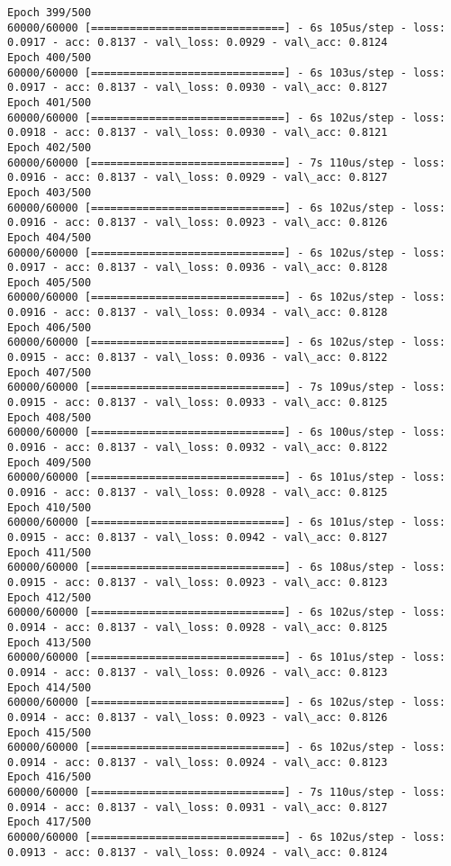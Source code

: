 \documentclass[11pt]{article}
\begin{document}
\begin{Verbatim}[commandchars=\\\{\}]
Epoch 399/500
60000/60000 [==============================] - 6s 105us/step - loss: 0.0917 - acc: 0.8137 - val\_loss: 0.0929 - val\_acc: 0.8124
Epoch 400/500
60000/60000 [==============================] - 6s 103us/step - loss: 0.0917 - acc: 0.8137 - val\_loss: 0.0930 - val\_acc: 0.8127
Epoch 401/500
60000/60000 [==============================] - 6s 102us/step - loss: 0.0918 - acc: 0.8137 - val\_loss: 0.0930 - val\_acc: 0.8121
Epoch 402/500
60000/60000 [==============================] - 7s 110us/step - loss: 0.0916 - acc: 0.8137 - val\_loss: 0.0929 - val\_acc: 0.8127
Epoch 403/500
60000/60000 [==============================] - 6s 102us/step - loss: 0.0916 - acc: 0.8137 - val\_loss: 0.0923 - val\_acc: 0.8126
Epoch 404/500
60000/60000 [==============================] - 6s 102us/step - loss: 0.0917 - acc: 0.8137 - val\_loss: 0.0936 - val\_acc: 0.8128
Epoch 405/500
60000/60000 [==============================] - 6s 102us/step - loss: 0.0916 - acc: 0.8137 - val\_loss: 0.0934 - val\_acc: 0.8128
Epoch 406/500
60000/60000 [==============================] - 6s 102us/step - loss: 0.0915 - acc: 0.8137 - val\_loss: 0.0936 - val\_acc: 0.8122
Epoch 407/500
60000/60000 [==============================] - 7s 109us/step - loss: 0.0915 - acc: 0.8137 - val\_loss: 0.0933 - val\_acc: 0.8125
Epoch 408/500
60000/60000 [==============================] - 6s 100us/step - loss: 0.0916 - acc: 0.8137 - val\_loss: 0.0932 - val\_acc: 0.8122
Epoch 409/500
60000/60000 [==============================] - 6s 101us/step - loss: 0.0916 - acc: 0.8137 - val\_loss: 0.0928 - val\_acc: 0.8125
Epoch 410/500
60000/60000 [==============================] - 6s 101us/step - loss: 0.0915 - acc: 0.8137 - val\_loss: 0.0942 - val\_acc: 0.8127
Epoch 411/500
60000/60000 [==============================] - 6s 108us/step - loss: 0.0915 - acc: 0.8137 - val\_loss: 0.0923 - val\_acc: 0.8123
Epoch 412/500
60000/60000 [==============================] - 6s 102us/step - loss: 0.0914 - acc: 0.8137 - val\_loss: 0.0928 - val\_acc: 0.8125
Epoch 413/500
60000/60000 [==============================] - 6s 101us/step - loss: 0.0914 - acc: 0.8137 - val\_loss: 0.0926 - val\_acc: 0.8123
Epoch 414/500
60000/60000 [==============================] - 6s 102us/step - loss: 0.0914 - acc: 0.8137 - val\_loss: 0.0923 - val\_acc: 0.8126
Epoch 415/500
60000/60000 [==============================] - 6s 102us/step - loss: 0.0914 - acc: 0.8137 - val\_loss: 0.0924 - val\_acc: 0.8123
Epoch 416/500
60000/60000 [==============================] - 7s 110us/step - loss: 0.0914 - acc: 0.8137 - val\_loss: 0.0931 - val\_acc: 0.8127
Epoch 417/500
60000/60000 [==============================] - 6s 102us/step - loss: 0.0913 - acc: 0.8137 - val\_loss: 0.0924 - val\_acc: 0.8124

\end{Verbatim}
\end{document}
